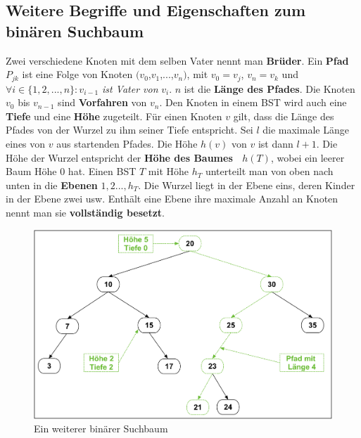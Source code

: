 \documentclass[a4paper,12pt]{article}
\begin{document}
\subsection{Weitere Begriffe und Eigenschaften zum binären Suchbaum}	
\noindent Zwei verschiedene Knoten mit dem selben Vater nennt man \textbf{Brüder}. Ein \textbf{Pfad} $P_{jk}$ ist eine Folge von Knoten $(v_0$,$v_1$,...,$v_n)$, mit $v_0 = v_j$, $v_n = v_k$ und $\forall i \in \{ 1, 2,..., n \} \colon v_{i-1}$ \textit{ist Vater von} $v_i$. $n$ ist die \textbf{Länge des Pfades}. Die Knoten  $v_0$ bis $v_{n-1}$ sind \textbf{Vorfahren} von $v_n$. Den Knoten in einem BST wird auch eine \textbf{Tiefe} und eine \textbf{Höhe} zugeteilt. Für einen Knoten $v$ gilt, dass die Länge des Pfades von der Wurzel zu ihm seiner Tiefe entspricht. Sei $l$ die maximale Länge eines von $v$ aus startenden Pfades. Die Höhe $\mathit{h(v)}$ von $v$ ist dann $l+1$. Die Höhe der Wurzel entspricht der \textbf{Höhe des Baumes~ $h(T)$}, wobei ein leerer Baum Höhe $0$ hat. Einen BST $T$ mit Höhe $h_T$ unterteilt man von oben nach unten in die \textbf{Ebenen} $\mathit{1,2...,h_T}$. Die Wurzel liegt in der Ebene eins, deren Kinder in der Ebene zwei usw. Enthält eine Ebene ihre maximale Anzahl an Knoten nennt man sie \textbf{vollständig besetzt}.
\begin{figure}[h]
	\centering
	\includegraphics[width= 1\textwidth]{"Medien/Einleitung/suchbaum2_2"}
	\caption{Ein weiterer binärer Suchbaum }
	\label{fig:suchbaum2_2}
\end{figure}
\end{document}
